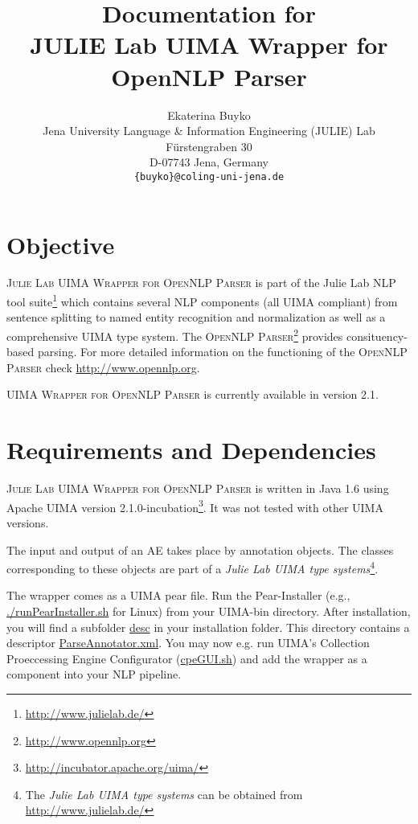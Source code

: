\documentclass[11pt,a4paper,halfparskip]{scrartcl}
\title{\small{Documentation for}\\\huge JULIE Lab UIMA Wrapper for \\OpenNLP Parser}
\author{\normalsize Ekaterina Buyko\\
  \normalsize  Jena University Language \& Information Engineering (JULIE) Lab\\
  \normalsize F\"urstengraben 30 \\
  \normalsize D-07743 Jena, Germany\\
  {\normalsize \tt \{buyko\}@coling-uni-jena.de} }
\date{}
\begin{document}
\maketitle

\section{Objective}




\textsc{Julie Lab UIMA Wrapper for OpenNLP Parser} is part of the Julie Lab NLP tool
suite\footnote{\url{http://www.julielab.de/}} which contains several NLP components 
(all UIMA compliant) from sentence splitting to named entity recognition and 
normalization as well as a comprehensive UIMA type system. The \textsc{OpenNLP Parser}\footnote{\url{http://www.opennlp.org}} 
provides consituency-based parsing. For more detailed information on the 
functioning of the \textsc{OpenNLP Parser} check \url{http://www.opennlp.org}.

\textsc{UIMA Wrapper for OpenNLP Parser} is currently available in version 2.1.






\section{Requirements and Dependencies}



\textsc{Julie Lab UIMA Wrapper for OpenNLP Parser} is written in Java 1.6 using Apache
UIMA version 2.1.0-incubation\footnote{\url{http://incubator.apache.org/uima/}}. It
was not tested with other UIMA versions.

The input and output of an AE takes place by annotation objects. The 
classes corresponding to these objects are part of a \emph{Julie Lab UIMA
  type systems}\footnote{The \emph{Julie Lab UIMA type systems} can be
  obtained from \url{http://www.julielab.de/}}.

The wrapper comes as a UIMA pear file. Run the Pear-Installer (e.g.,
\url{./runPearInstaller.sh} for Linux) from your UIMA-bin directory.
After installation, you will find a subfolder \url{desc} in your
installation folder. This directory contains a descriptor
\url{ParseAnnotator.xml}. You may now e.g. run UIMA's
Collection Proeccessing Engine Configurator (\url{cpeGUI.sh}) and add
the wrapper as a component into your NLP pipeline.
\end{document}
